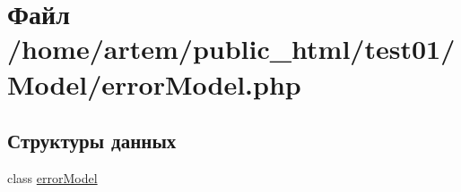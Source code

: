 \hypertarget{error_model_8php}{\section{Файл /home/artem/public\-\_\-html/test01/\-Model/error\-Model.php}
\label{error_model_8php}
}
\subsection*{Структуры данных}
\begin{DoxyCompactItemize}
\item 
class \hyperlink{classerror_model}{error\-Model}
\end{DoxyCompactItemize}
